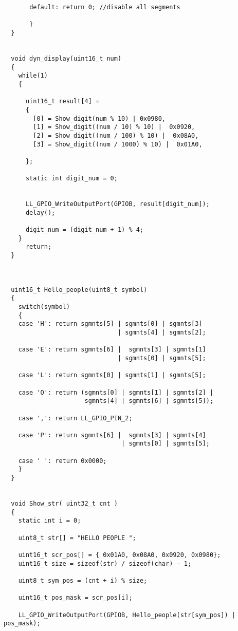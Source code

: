 \begin{verbatim}
       default: return 0; //disable all segments 
            
       }
  }
  
  
  void dyn_display(uint16_t num)
  {
    while(1)
    {
    
      uint16_t result[4] = 
      {
        [0] = Show_digit(num % 10) | 0x0980,                         
        [1] = Show_digit((num / 10) % 10) |  0x0920,         
        [2] = Show_digit((num / 100) % 10) |  0x08A0,     
        [3] = Show_digit((num / 1000) % 10) |  0x01A0,        
    
      };
      
      static int digit_num = 0;
     
   
      LL_GPIO_WriteOutputPort(GPIOB, result[digit_num]); 
      delay();
      
      digit_num = (digit_num + 1) % 4;
    }
      return;
  }
  
  
  
  uint16_t Hello_people(uint8_t symbol)
  {
    switch(symbol)
    {
    case 'H': return sgmnts[5] | sgmnts[0] | sgmnts[3] 
                               | sgmnts[4] | sgmnts[2];
    
    case 'E': return sgmnts[6] |  sgmnts[3] | sgmnts[1] 
                               | sgmnts[0] | sgmnts[5];
    
    case 'L': return sgmnts[0] | sgmnts[1] | sgmnts[5];
    
    case 'O': return (sgmnts[0] | sgmnts[1] | sgmnts[2] |
                      sgmnts[4] | sgmnts[6] | sgmnts[5]);
              
    case ',': return LL_GPIO_PIN_2; 
    
    case 'P': return sgmnts[6] |  sgmnts[3] | sgmnts[4] 
                                | sgmnts[0] | sgmnts[5];
    
    case ' ': return 0x0000;
    }
  }
  
  
  void Show_str( uint32_t cnt )
  {
    static int i = 0;
  
    uint8_t str[] = "HELLO PEOPLE ";
    
    uint16_t scr_pos[] = { 0x01A0, 0x08A0, 0x0920, 0x0980};
    uint16_t size = sizeof(str) / sizeof(char) - 1;
  
    uint8_t sym_pos = (cnt + i) % size;
   
    uint16_t pos_mask = scr_pos[i];
  
    LL_GPIO_WriteOutputPort(GPIOB, Hello_people(str[sym_pos]) | pos_mask);
    

\end{verbatim}
